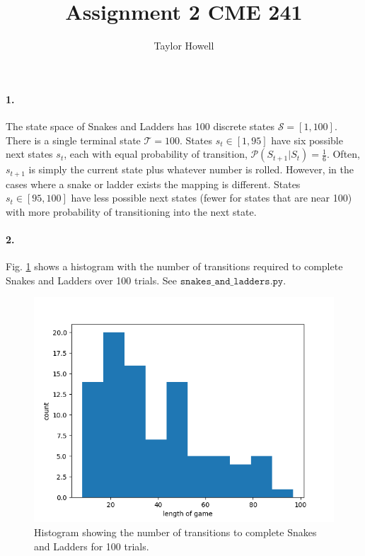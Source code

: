 \documentclass[12pt]{article}
\title{Assignment 2 CME 241}
\author{Taylor Howell}
\begin{document}
\maketitle

\paragraph{1.}
The state space of Snakes and Ladders has 100 discrete states $\mathcal{S} = [1, 100]$. There is a single terminal state $\mathcal{T} = 100$. States $s_t \in [1, 95]$ have six possible next states $s_t$, each with equal probability of transition, $\mathcal{P}(S_{t+1} | S_t) = \frac{1}{6}$. Often, $s_{t+1}$ is simply the current state plus whatever number is rolled. However, in the cases where a snake or ladder exists the mapping is different. States $s_t \in [95, 100]$ have less possible next states (fewer for states that are near 100) with more probability of transitioning into the next state.

\paragraph{2.}
Fig. \ref{snakes_and_ladders} shows a histogram with the number of transitions required to complete Snakes and Ladders over 100 trials. See $\texttt{snakes\_and\_ladders.py}$. 
\begin{figure}[h]
	\centering
	\includegraphics[width=.5\textwidth]{snakes_and_ladders_length_histogram.png}
	\caption{Histogram showing the number of transitions to complete Snakes and Ladders for 100 trials.}
	\label{snakes_and_ladders}
\end{figure}
\end{document}
